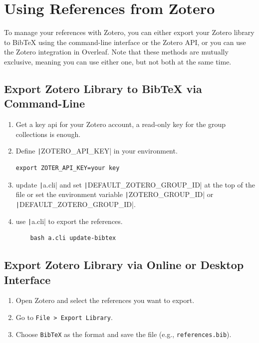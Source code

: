 \documentclass[a4paper]{article}
\begin{document}
\section{Using References from Zotero}

To manage your references with Zotero, you can either export your Zotero library to BibTeX using the command-line interface or the Zotero API, or you can use the Zotero integration in Overleaf. 
Note that these methods are mutually exclusive, meaning you can use either one, but not both at the same time.

\subsection{Export Zotero Library to BibTeX via Command-Line}
\label{sec:export-zotero-library:cli}
\begin{enumerate}
    \item Get a key api for your Zotero account, a read-only key for the group collections is enough.
    \item Define \texttt|ZOTERO_API_KEY| in your environment.
\begin{verbatim}
export ZOTER_API_KEY=your key 
\end{verbatim}
    \item update \texttt|a.cli| and set \texttt|DEFAULT_ZOTERO_GROUP_ID| at the top of the file or set the environment variable \texttt|ZOTERO_GROUP_ID| or \texttt|DEFAULT_ZOTERO_GROUP_ID|.
    \item use \texttt|a.cli| to export the references.
\begin{verbatim}
    bash a.cli update-bibtex
\end{verbatim}
\end{enumerate}

\subsection{Export Zotero Library via Online or Desktop Interface}
\label{sec:export-zotero-library:interface}
\begin{enumerate}
    \item Open Zotero and select the references you want to export.
    \item Go to \texttt{File > Export Library}.
    \item Choose \texttt{BibTeX} as the format and save the file (e.g., \texttt{references.bib}).
\end{enumerate}
\end{document}

